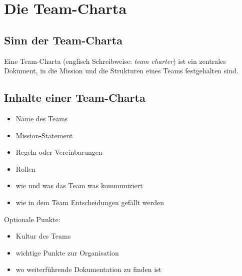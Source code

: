 \section{Die Team-Charta}
\label{team-charta}


\subsection{Sinn der Team-Charta}

Eine Team-Charta (englisch Schreibweise: \emph{team charter}) ist ein zentrales Dokument, in die Mission und die Strukturen eines Teams festgehalten sind.


\subsection{Inhalte einer Team-Charta}

\begin{itemize}
  \item Name des Teams
  \item Mission-Statement
  \item Regeln oder Vereinbarungen
  \item Rollen
  \item wie und was das Team was kommuniziert
  \item wie in dem Team Entscheidungen gefällt werden
\end{itemize}

Optionale Punkte:

\begin{itemize}
  \item Kultur des Teams
  \item wichtige Punkte zur Organisation
  \item wo weiterführende Dokumentation zu finden ist
\end{itemize}
